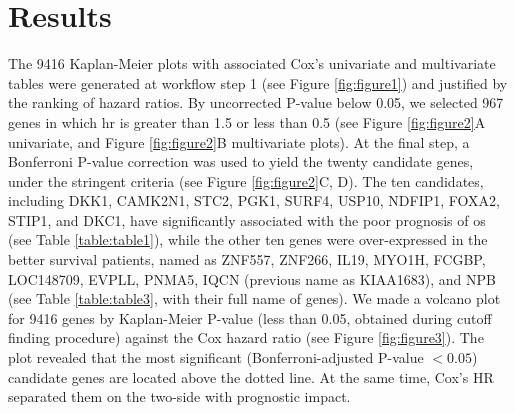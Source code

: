 \documentclass[cancers,article,submit,moreauthors,pdftex]{Definitions/mdpi}
\begin{document}
\section{Results}


The 9416 Kaplan-Meier plots with associated Cox's univariate and multivariate tables were generated at workflow step 1 (see Figure \ref{fig:figure1}) and justified by the ranking of hazard ratios.
By uncorrected P-value below 0.05, we selected 967 genes in which \acrfull{hr} is greater than 1.5 or less than 0.5 (see Figure \ref{fig:figure2}A univariate, and Figure \ref{fig:figure2}B  multivariate plots). At the final step, a Bonferroni P-value correction was used to yield the twenty candidate genes, under the stringent criteria (see Figure \ref{fig:figure2}C, D). The ten candidates, including DKK1, CAMK2N1, STC2, PGK1, SURF4, USP10, NDFIP1, FOXA2, STIP1, and DKC1, have significantly associated with the poor prognosis of \acrshort{os} (see Table \ref{table:table1}),
while the other ten genes were over-expressed in the better survival patients, named as ZNF557, ZNF266, IL19, MYO1H, FCGBP, LOC148709, EVPLL, PNMA5, IQCN (previous name as KIAA1683), and NPB (see Table \ref{table:table3}, with their full name of genes).
We made a volcano plot for 9416 genes by Kaplan-Meier P-value (less than 0.05, obtained during cutoff finding procedure) against the Cox hazard ratio (see Figure \ref{fig:figure3}). The plot revealed that the most significant (Bonferroni-adjusted P-value $< 0.05$) candidate genes are located above the dotted line. At the same time, Cox's HR separated them on the two-side with prognostic impact.
\end{document}
